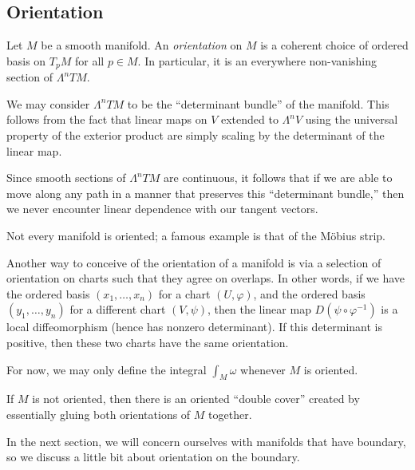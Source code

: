 \documentclass[10pt]{mypackage}
\begin{document}
\subsection{Orientation}%
\begin{definition}
  Let $M$ be a smooth manifold. An \textit{orientation} on $M$ is a coherent choice of ordered basis on $T_pM$ for all $p\in M$. In particular, it is an everywhere non-vanishing section of $\Lambda^{n}T M$.
\end{definition}
\begin{remark}
  We may consider $\Lambda^{n}TM$ to be the ``determinant bundle'' of the manifold. This follows from the fact that linear maps on $V$ extended to $\Lambda^{n}V$ using the universal property of the exterior product are simply scaling by the determinant of the linear map.\newline

  Since smooth sections of $\Lambda^{n}TM$ are continuous, it follows that if we are able to move along any path in a manner that preserves this ``determinant bundle,'' then we never encounter linear dependence with our tangent vectors.
\end{remark}
Not every manifold is oriented; a famous example is that of the Möbius strip.\newline

Another way to conceive of the orientation of a manifold is via a selection of orientation on charts such that they agree on overlaps. In other words, if we have the ordered basis $\left( x_1,\dots,x_n \right)$ for a chart $\left( U,\varphi \right)$, and the ordered basis $\left( y_1,\dots,y_n \right)$ for a different chart $\left( V,\psi \right)$, then the linear map $D\left( \psi\circ\varphi^{-1} \right)$ is a local diffeomorphism (hence has nonzero determinant). If this determinant is positive, then these two charts have the same orientation.\newline

For now, we may only define the integral $ \int_{M}^{}\omega $ whenever $M$ is oriented.
\begin{remark}
  If $M$ is not oriented, then there is an oriented ``double cover'' created by essentially gluing both orientations of $M$ together.
\end{remark}
In the next section, we will concern ourselves with manifolds that have boundary, so we discuss a little bit about orientation on the boundary.\newline
\end{document}
